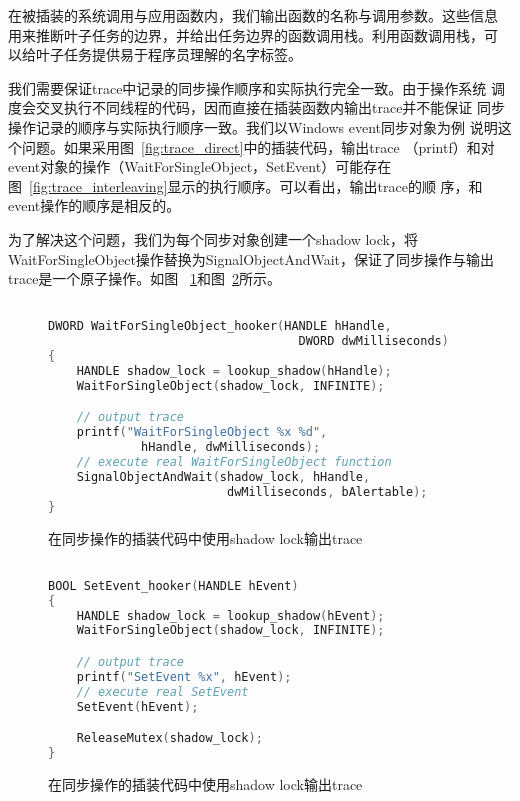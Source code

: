 在被插装的系统调用与应用函数内，我们输出函数的名称与调用参数。这些信息
用来推断叶子任务的边界，并给出任务边界的函数调用栈。利用函数调用栈，可
以给叶子任务提供易于程序员理解的名字标签。


我们需要保证trace中记录的同步操作顺序和实际执行完全一致。由于操作系统
调度会交叉执行不同线程的代码，因而直接在插装函数内输出trace并不能保证
同步操作记录的顺序与实际执行顺序一致。我们以Windows event同步对象为例
说明这个问题。如果采用图~\ref{fig:trace_direct}中的插装代码，输出trace
（printf）和对event对象的操作（WaitForSingleObject，SetEvent）可能存在
图~\ref{fig:trace_interleaving}显示的执行顺序。可以看出，输出trace的顺
序，和event操作的顺序是相反的。

为了解决这个问题，我们为每个同步对象创建一个shadow lock，将
WaitForSingleObject操作替换为SignalObjectAndWait，保证了同步操作与输出
trace是一个原子操作。如图
~\ref{fig:trace_shadowlock1}和图~\ref{fig:trace_shadowlock2}所示。

\begin{figure}[htb]
\centering
\begin{lstlisting}[language=C++, basicstyle=\small]

DWORD WaitForSingleObject_hooker(HANDLE hHandle, 
                                   DWORD dwMilliseconds)
{
    HANDLE shadow_lock = lookup_shadow(hHandle);
    WaitForSingleObject(shadow_lock, INFINITE);

    // output trace
    printf("WaitForSingleObject %x %d", 
             hHandle, dwMilliseconds);
    // execute real WaitForSingleObject function
    SignalObjectAndWait(shadow_lock, hHandle, 
                         dwMilliseconds, bAlertable);
}
\end{lstlisting}
\caption{在同步操作的插装代码中使用shadow lock输出trace}
\label{fig:trace_shadowlock1}
\end{figure}

\begin{figure}[htb]
\centering
\begin{lstlisting}[language=C++, basicstyle=\small]

BOOL SetEvent_hooker(HANDLE hEvent)
{
    HANDLE shadow_lock = lookup_shadow(hEvent);
    WaitForSingleObject(shadow_lock, INFINITE);

    // output trace
    printf("SetEvent %x", hEvent);
    // execute real SetEvent
    SetEvent(hEvent);

    ReleaseMutex(shadow_lock);
}

\end{lstlisting}
\caption{在同步操作的插装代码中使用shadow lock输出trace}
\label{fig:trace_shadowlock2}
\end{figure}

